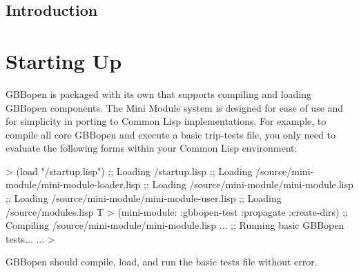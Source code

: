 \documentclass[10pt,twoside,english,pdftex]{article}
\begin{document}

\W\begin{iftex}
  \markright{}%
  \cleardoublepage
  \setcounter{page}{1}
  \pagestyle{fancy}
  \thispagestyle{fancybottom}
  \section*{Introduction}
  \label{sec:introduction}%
  \intro
\W\end{iftex}


\T\markright{}%
\T\pagestyle{plain}
\T\cleardoublepage
\W{}
\T\pagestyle{fancy}
\T\thispagestyle{fancybottom}
\W{}
\T\global\def\fnlastname{ }%
\section{Starting Up}
\label{sec:startup}%

GBBopen is packaged with its own  that
supports compiling and loading GBBopen components.  The Mini Module system
is designed for ease of use and for simplicity in porting to Common Lisp
implementations.  For example, to compile all core GBBopen  and
execute a basic trip-tests file, you only need to evaluate the following forms
within your Common Lisp environment:
%
\W\supp
\begin{example}
  > (load "/startup.lisp")
  ;; Loading /startup.lisp
  ;;  Loading /source/mini-module/mini-module-loader.lisp
  ;;   Loading /source/mini-module/mini-module.lisp
  ;;     Loading /source/mini-module/mini-module-user.lisp
  ;;  Loading /source/modules.lisp
  T
  > (mini-module: :gbbopen-test :propagate :create-dirs)
  ;; Compiling /source/mini-module/mini-module.lisp
       ...
  ;; Running basic GBBopen tests...
       ...
  >
\end{example}
%
GBBopen should compile, load, and run the basic tests file without error.
\end{document}
